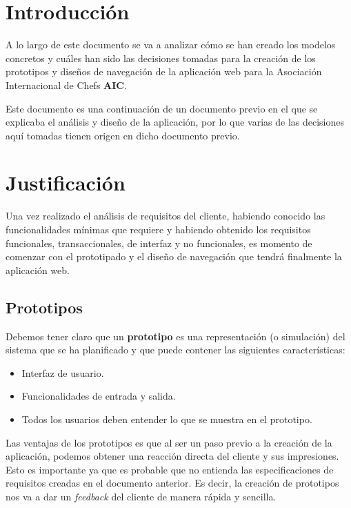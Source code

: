 \documentclass{\ClassPath/viu-tfm-template}
\begin{document}
    \graphicspath{{../../VIU_TFM_LaTeX_template/}}

    \coverpage

    \tableofcontents

\chapter{Introducción}
A lo largo de este documento se va a analizar cómo se han creado los modelos concretos y cuáles han sido las decisiones tomadas para la creación de los prototipos y diseños de navegación de la aplicación web para la Asociación Internacional de Chefs \textbf{AIC}.

Este documento es una continuación de un documento previo en el que se explicaba el análisis y diseño de la aplicación, por lo que varias de las decisiones aquí tomadas tienen origen en dicho documento previo.


\chapter{Justificación}
Una vez realizado el análisis de requisitos del cliente, habiendo conocido las funcionalidades mínimas que requiere y habiendo obtenido los requisitos funcionales, transaccionales, de interfaz y no funcionales, es momento de comenzar con el prototipado y el diseño de navegación que tendrá finalmente la aplicación web.

\section{Prototipos}
Debemos tener claro que un \textbf{prototipo} es una representación (o simulación) del sistema que se ha planificado y que puede contener las siguientes características:

\vspace{-1em}
\begin{itemize}
    \item Interfaz de usuario.
    \item Funcionalidades de entrada y salida.
    \item Todos los usuarios deben entender lo que se muestra en el prototipo.
\end{itemize}

Las ventajas de los prototipos es que al ser un paso previo a la creación de la aplicación, podemos obtener una reacción directa del cliente y sus impresiones. Esto es importante ya que es probable que no entienda las especificaciones de requisitos creadas en el documento anterior. Es decir, la creación de prototipos nos va a dar un \textit{feedback} del cliente de manera rápida y sencilla.
\end{document}
